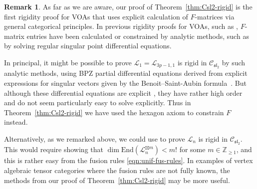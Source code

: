 \documentclass[pdftex]{sigma}
\numberwithin{equation}{section}
\theoremstyle{definition}
\newtheorem{Remark}[Theorem]{Remark}
\begin{document}
\begin{Remark}
As far as we are aware, our proof of Theorem~\ref{thm:Csl2-rigid} is the first rigidity proof for VOAs that uses explicit calculation of $F$-matrices via general categorical principles. In previous rigidity proofs for VOAs, such as \cite{ CMY2, Hu-rigidity, MS-cpq-Vir, MY-cp1-Vir, TW1}, $F$-matrix entries have been calculated or constrained by analytic methods, such as by solving regular singular point differential equations.

In principal, it might be possible to prove $\mathcal{L}_1=\mathcal{L}_{3p-1,1}$ is rigid in $\mathcal{C}_{\mathfrak{sl}_2}$ by such analytic methods, using BPZ partial differential equations derived from explicit expressions for singular vectors given by the Benoit--Saint-Aubin formula~\cite{BS-A}. But although these differential equations are explicit \cite[Section~5.3]{KK}, they have rather high order and do not seem particularly easy to solve explicitly.
Thus in Theorem~\ref{thm:Csl2-rigid} we have used the hexagon axiom to constrain $F$ instead.

Alternatively, as we remarked above, we could use \cite[Theorem 1.1]{EP} to prove $\mathcal{L}_n$ is rigid in $\mathcal{C}_{\mathfrak{sl}_2}$. This would require showing that $\dim\mathrm{End}(\mathcal{L}_n^{\boxtimes m})< m!$ for some $m\in\mathbb{Z}_{\geq 1}$, and this is rather easy from the fusion rules \eqref{eqn:unif-fus-rules}. In examples of vertex algebraic tensor categories where the fusion rules are not fully known, the methods from our proof of Theorem~\ref{thm:Csl2-rigid} may be more useful.
\end{Remark}
\end{document}
